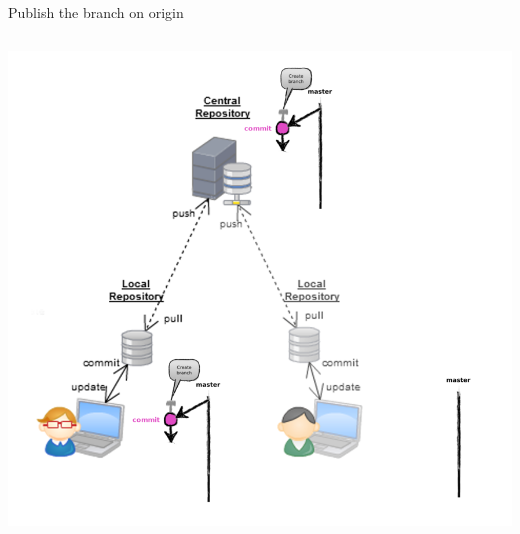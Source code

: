 \begin{frame}[fragile]{Publish the branch on origin}
\begin{columns}
\begin{column}{0.6\textwidth}
\begin{center}
{			}\only<3> {
				\includegraphics[width=.9\textwidth]{multiuser_push_branch.png}
			}
		\end{center}
	\end{column}
\end{columns}
\end{frame}


